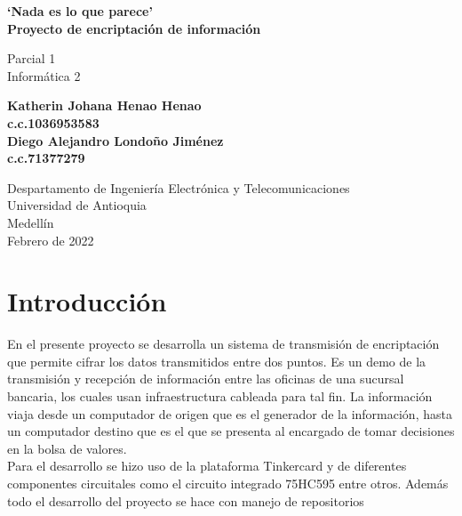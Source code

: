 \documentclass{article}
\begin{document}
\begin{titlepage}
    \begin{center}
        \vspace*{2cm}
            
        \Huge
        \textbf{`Nada es lo que parece' \\
        Proyecto de encriptación de información}
            
        \vspace{0.5cm}
        \LARGE
        Parcial 1\\
        Informática 2

        
            
        \vspace{2,5cm}
            
        \textbf{
        Katherin Johana Henao Henao\\
        c.c.1036953583\\
        Diego Alejandro Londoño Jiménez\\
        c.c.71377279\\
        }
            
        \vfill
            
        \vspace{2,5cm}
            
        \Large
        Despartamento de Ingeniería Electrónica y Telecomunicaciones\\
        Universidad de Antioquia\\
        Medellín\\
        Febrero de 2022
            
    \end{center}
\end{titlepage}

\tableofcontents
\newpage


\section{Introducción}
\label{intro}
En el presente proyecto se desarrolla un sistema de transmisión de encriptación que permite cifrar los datos transmitidos entre dos puntos. Es un demo de la transmisión y recepción de información entre las oficinas de una sucursal bancaria, los cuales usan infraestructura cableada para tal fin. La información viaja desde un computador de origen que es el generador de la información, hasta un computador destino que es el que se presenta al encargado de tomar decisiones en la bolsa de valores. \\
Para el desarrollo se hizo uso de la plataforma Tinkercard y de diferentes componentes circuitales como el circuito integrado 75HC595 entre otros. Además todo el desarrollo del proyecto se hace con manejo de repositorios
\end{document}
